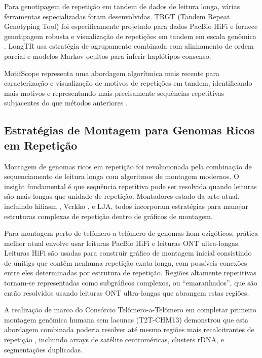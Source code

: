 Para genotipagem de repetição em tandem de dados de leitura longa, várias ferramentas especializadas foram desenvolvidas. TRGT (Tandem Repeat Genotyping Tool) foi especificamente projetado para dados PacBio HiFi e fornece genotipagem robusta e visualização de repetições em tandem em escala genômica \parencite{dolzhenko2024}. LongTR usa estratégia de agrupamento combinada com alinhamento de ordem parcial e modelos Markov ocultos para inferir haplótipos consenso.

MotifScope representa uma abordagem algorítmica mais recente para caracterização e visualização de motivos de repetições em tandem, identificando mais motivos e representando mais precisamente sequências repetitivas subjacentes do que métodos anteriores \parencite{zhang2025}.

\subsection{Estratégias de Montagem para Genomas Ricos em Repetição}

Montagem de genomas ricos em repetição foi revolucionada pela combinação de sequenciamento de leitura longa com algoritmos de montagem modernos. O insight fundamental é que sequência repetitiva pode ser resolvida quando leituras são mais longas que unidade de repetição. Montadores estado-da-arte atual, incluindo hifiasm \parencite{cheng2021}, Verkko \parencite{rautiainen2023}, e LJA, todos incorporam estratégias para manejar estruturas complexas de repetição dentro de gráficos de montagem.

Para montagem perto de telômero-a-telômero de genomas hom ozigóticos, prática melhor atual envolve usar leituras PacBio HiFi e leituras ONT ultra-longas. Leituras HiFi são usadas para construir gráfico de montagem inicial consistindo de unitigs que contêm nenhuma repetição exata longa, com possíveis conexões entre eles determinadas por estrutura de repetição. Regiões altamente repetitivas tornam-se representadas como subgráficos complexos, ou ``emaranhados'', que são então resolvidos usando leituras ONT ultra-longas que abrangem estas regiões.

A realização de marco do Consórcio Telômero-a-Telômero em completar primeiro montagem genômica humana sem lacunas (T2T-CHM13) demonstrou que esta abordagem combinada poderia resolver até mesmo regiões mais recalcitrantes de repetição \parencite{rhie2021b,nurk2022}, incluindo arrays de satélite centroméricas, clusters rDNA, e segmentações duplicadas.

